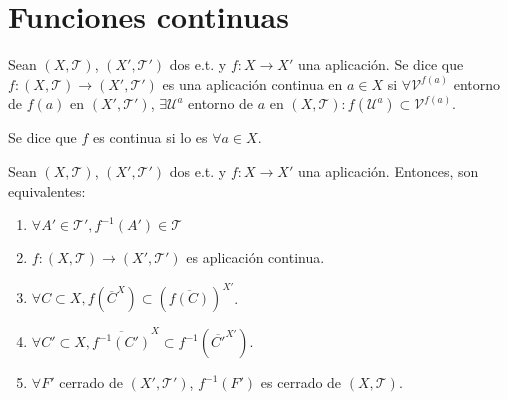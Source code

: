 \section{Funciones continuas}

\begin{defn}
  Sean $( X, \mathcal{T} )$, $( X', \mathcal{T}' )$ dos e.t. y $f: X \to X'$ una aplicación. Se dice que $f: ( X, \mathcal{T} ) \to ( X', \mathcal{T}' )$ es una aplicación continua en $a \in X$ si $\forall \mathcal{V}^{f(a)}$ entorno de $f(a)$ en $( X', \mathcal{T}' )$, $\exists \mathcal{U}^{a}$ entorno de $a$ en $( X, \mathcal{T} ): f(\mathcal{U}^{a}) \subset \mathcal{V}^{f(a)}$.
\end{defn}

\begin{obs}
  Se dice que $f$ es continua si lo es $\forall a \in X$.
\end{obs}

\begin{theo}
  Sean $( X, \mathcal{T} )$, $( X', \mathcal{T}' )$ dos e.t. y $f: X \to X'$ una aplicación. Entonces, son equivalentes:
  \begin{enumerate}[label=(\roman*)]
    \item $\forall A' \in \mathcal{T}', f^{-1}(A') \in \mathcal{T}$
    \item $f: ( X, \mathcal{T} ) \to ( X', \mathcal{T}' )$ es aplicación continua.
    \item $\forall C \subset X, f(\overline{C}^{X}) \subset (\overline{f(C)})^{X'}$.
    \item $\forall C' \subset X, \overline{f^{-1}(C')}^{X} \subset f^{-1}(\overline{C'}^{X'})$.
    \item $\forall F'$ cerrado de $( X', \mathcal{T}' )$, $f^{-1}(F')$ es cerrado de $( X, \mathcal{T} )$.
  \end{enumerate}
\end{theo}


